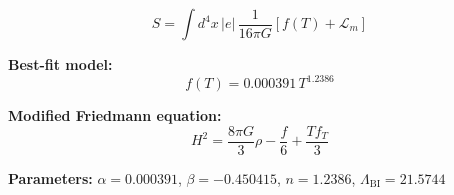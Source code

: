 
\begin{equation}
  S = \int d^4x \, |e| \, \frac{1}{16\pi G} \left[ f(T) + \mathcal{L}_m \right]
\end{equation}

\textbf{Best-fit model:}
\begin{equation}
  f(T) = 0.000391 \, T^{1.2386}
\end{equation}

\textbf{Modified Friedmann equation:}
\begin{equation}
  H^2 = \frac{8\pi G}{3} \rho - \frac{f}{6} + \frac{T f_T}{3}
\end{equation}

\textbf{Parameters:}
$\alpha = 0.000391$, \quad
$\beta = -0.450415$, \quad
$n = 1.2386$, \quad
$\Lambda_{\text{BI}} = 21.5744$